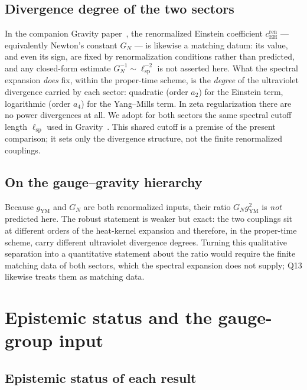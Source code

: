 \documentclass[12pt,a4paper]{article}
\theoremstyle{remark}
\theoremstyle{plain}
\theoremstyle{definition}
\begin{document}
    \subsection{Divergence degree of the two sectors}
      \label{subsec:newton}

      In the companion Gravity paper~\cite{Beau2026h}, the renormalized
      Einstein coefficient $c_{\mathrm{EH}}^{\mathrm{ren}}$ ---
      equivalently Newton's constant $G_N$ --- is likewise a matching
      datum: its value, and even its sign, are fixed by renormalization
      conditions rather than predicted, and any closed-form estimate
      $G_N^{-1}\sim\ell_{\mathrm{sp}}^{-2}$ is not asserted here.
      What the spectral expansion \emph{does} fix, within the proper-time scheme, is the
      \emph{degree} of the ultraviolet divergence carried by each sector: quadratic
      (order $a_2$) for the Einstein term, logarithmic (order $a_4$)
      for the Yang--Mills term. In zeta regularization there are no power divergences at all.
      We adopt for both sectors the same spectral cutoff length
      $\ell_{\mathrm{sp}}$ used in Gravity~\cite{Beau2026h}.
      This shared cutoff is a premise of the present comparison; it sets only
      the divergence structure, not the finite renormalized couplings.

    \subsection{On the gauge--gravity hierarchy}
      \label{subsec:hierarchy}

      Because $g_{\mathrm{YM}}$ and $G_N$ are both renormalized inputs,
      their ratio $G_N g_{\mathrm{YM}}^2$ is \emph{not} predicted here.
      The robust statement is weaker but exact: the
      two couplings sit at different orders of the heat-kernel
      expansion and therefore, in the proper-time scheme, carry different ultraviolet divergence
      degrees. Turning this qualitative separation into a quantitative
      statement about the ratio would require the finite matching data of both sectors, which the
      spectral expansion does not supply; Q13 likewise treats them as matching data.

  \section{Epistemic status and the gauge-group input}
    \label{sec:status}

    \subsection{Epistemic status of each result}
      \label{subsec:epistemic-table}
\end{document}

